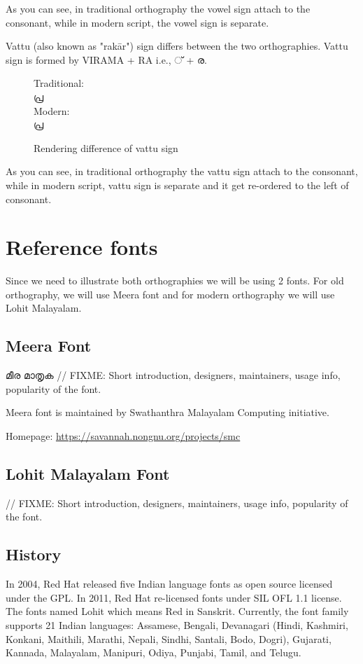 As you can see, in traditional orthography the vowel sign attach to the
consonant, while in modern script, the vowel sign is separate.

Vattu (also known as "rakār") sign differs between the two orthographies.
Vattu sign is formed by VIRAMA + RA i.e.,
{\malayalam ് + ര}.
\begin{figure}[h]
Traditional:\\ {\meera\textexample  പ്ര }\\
Modern: \\ {\lohitmalayalam\textexample  പ്ര }
   \caption{Rendering difference of vattu sign}
\end{figure}

As you can see, in traditional orthography the vattu sign attach to the
consonant, while in modern script, vattu sign is separate and it get re-ordered
to the left of consonant.


\section{Reference fonts}

Since we need to illustrate both orthographies we will be using 2
fonts. For old orthography, we will use Meera font and for modern
orthography we will use Lohit Malayalam.

\subsection {Meera Font}
{\meera മീര മാതൃക }
// FIXME: Short introduction, designers, maintainers, usage info, popularity of
the font.

Meera font is maintained by Swathanthra Malayalam Computing initiative.

Homepage: {\url{https://savannah.nongnu.org/projects/smc}}

\subsection {Lohit Malayalam Font}
// FIXME: Short introduction, designers, maintainers, usage info, popularity of
the font.

\subsection {History}
In 2004, Red Hat released five Indian language fonts as open source licensed
under the GPL. In 2011, Red Hat re-licensed fonts under SIL OFL 1.1 license.
The fonts named Lohit which means Red in Sanskrit. Currently, the font family
supports 21 Indian languages: Assamese, Bengali, Devanagari (Hindi, Kashmiri,
Konkani, Maithili, Marathi, Nepali, Sindhi, Santali, Bodo, Dogri), Gujarati,
Kannada, Malayalam, Manipuri, Odiya, Punjabi, Tamil, and Telugu.

